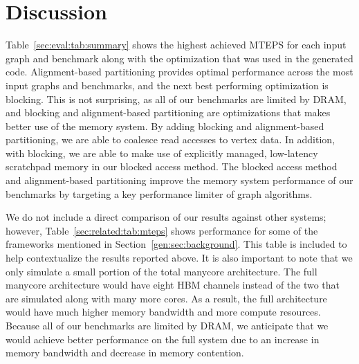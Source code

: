 \section{Discussion}\label{sec:discussion}



Table~\ref{sec:eval:tab:summary} shows the highest achieved MTEPS for each input graph and benchmark along with the optimization that was used in the generated code.
Alignment-based partitioning provides optimal performance across the most input graphs and benchmarks, and the next best performing optimization is blocking.
This is not surprising, as all of our benchmarks are limited by DRAM, and blocking and alignment-based partitioning are optimizations that makes better use of the memory system.
By adding blocking and alignment-based partitioning, we are able to coalesce read accesses to vertex data.
In addition, with blocking, we are able to make use of explicitly managed, low-latency scratchpad memory in our blocked access method. 
The blocked access method and alignment-based partitioning improve the memory system performance of our benchmarks by targeting a key performance limiter of graph algorithms.

\relatedMTEPSTable

We do not include a direct comparison of our results against other systems; however, Table~\ref{sec:related:tab:mteps} shows performance for some of the frameworks mentioned in Section~\ref{gen:sec:background}. This table is included to help contextualize the results reported above.
It is also important to note that we only simulate a small portion of the total manycore architecture. 
The full manycore architecture would have eight HBM channels instead of the two that are simulated along with many more cores.
As a result, the full architecture would have much higher memory bandwidth and more compute resources. 
Because all of our benchmarks are limited by DRAM, we anticipate that we would achieve better performance on the full system due to an increase in memory bandwidth and decrease in memory contention.

\overviewResultsTable
